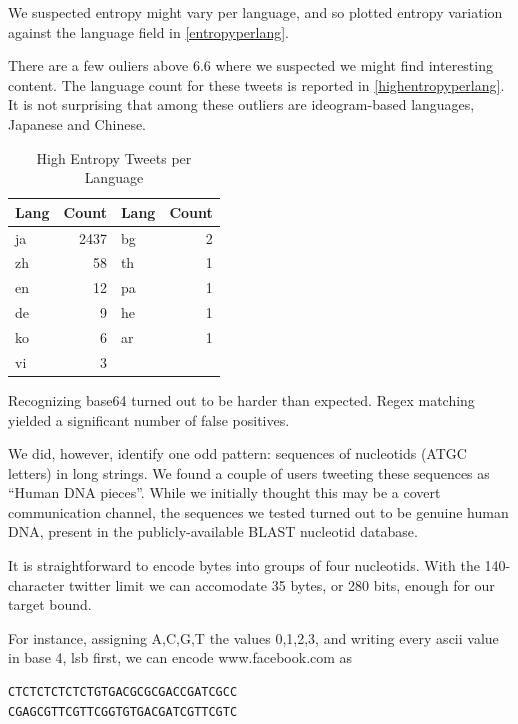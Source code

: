 \documentclass[a4paper,11pt]{article}
\begin{document}
We suspected entropy might vary per language, and so plotted entropy variation against the language field in \ref{entropyperlang}.


There are a few ouliers above 6.6 where we suspected we might find interesting content. The language count for these tweets is reported in \ref{highentropyperlang}. It is not surprising that among these outliers are ideogram-based languages, Japanese and Chinese.

\begin{table}
\centering
\begin{tabular}{|l|r||l|r|}
\hline
Lang & Count & Lang & Count \\
\hline
ja  & 2437 &  bg  &    2 \\
zh  & 58 & th   &   1 \\
en   &   12  & pa  &    1 \\
de   &   9 &   he  &    1 \\
ko    &  6 &  ar   &   1 \\
vi   &   3 & & \\
\hline
\end{tabular}
\caption{High Entropy Tweets per Language}
\end{table}

Recognizing base64 turned out to be harder than expected. Regex matching yielded a significant number of false positives.

We did, however, identify one odd pattern: sequences of nucleotids (ATGC letters) in long strings. We found a couple of users tweeting these sequences as ``Human DNA pieces''. While we initially thought this may be a covert communication channel, the sequences we tested turned out to be genuine human DNA, present in the publicly-available BLAST nucleotid database.


It is straightforward to encode bytes into groups of four nucleotids. With the 140-character twitter limit we can accomodate 35 bytes, or 280 bits, enough for our target bound.

For instance, assigning A,C,G,T the values 0,1,2,3, and writing every ascii value in base 4, lsb first, we can encode www.facebook.com as
\begin{verbatim}
CTCTCTCTCTCTGTGACGCGCGACCGATCGCC
CGAGCGTTCGTTCGGTGTGACGATCGTTCGTC
\end{verbatim}
\end{document}

